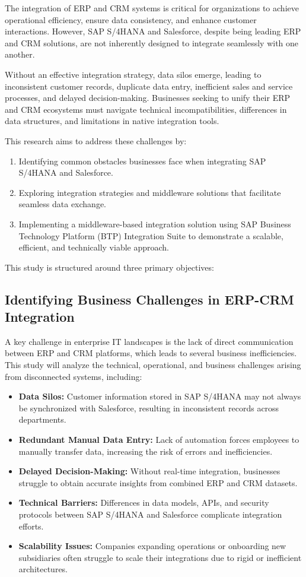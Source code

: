 The integration of ERP and CRM systems is critical for organizations to achieve operational efficiency, ensure data consistency, and enhance customer interactions. However, SAP S/4HANA and Salesforce, despite being leading ERP and CRM solutions, are not inherently designed to integrate seamlessly with one another.

Without an effective integration strategy, data silos emerge, leading to inconsistent customer records, duplicate data entry, inefficient sales and service processes, and delayed decision-making. Businesses seeking to unify their ERP and CRM ecosystems must navigate technical incompatibilities, differences in data structures, and limitations in native integration tools.

This research aims to address these challenges by:
\begin{enumerate}
    \item Identifying common obstacles businesses face when integrating SAP S/4HANA and Salesforce.
    \item Exploring integration strategies and middleware solutions that facilitate seamless data exchange.
    \item Implementing a middleware-based integration solution using SAP Business Technology Platform (BTP) Integration Suite to demonstrate a scalable, efficient, and technically viable approach.
\end{enumerate}

This study is structured around three primary objectives:

\subsection{Identifying Business Challenges in ERP-CRM Integration}
A key challenge in enterprise IT landscapes is the lack of direct communication between ERP and CRM platforms, which leads to several business inefficiencies. This study will analyze the technical, operational, and business challenges arising from disconnected systems, including:

\begin{itemize}
    \item \textbf{Data Silos:} Customer information stored in SAP S/4HANA may not always be synchronized with Salesforce, resulting in inconsistent records across departments.
    \item \textbf{Redundant Manual Data Entry:} Lack of automation forces employees to manually transfer data, increasing the risk of errors and inefficiencies.
    \item \textbf{Delayed Decision-Making:} Without real-time integration, businesses struggle to obtain accurate insights from combined ERP and CRM datasets.
    \item \textbf{Technical Barriers:} Differences in data models, APIs, and security protocols between SAP S/4HANA and Salesforce complicate integration efforts.
    \item \textbf{Scalability Issues:} Companies expanding operations or onboarding new subsidiaries often struggle to scale their integrations due to rigid or inefficient architectures.
\end{itemize}

